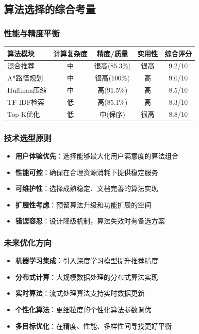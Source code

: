 \documentclass[12pt,a4paper]{article}
\begin{document}
\subsection{算法选择的综合考量}
\subsubsection{性能与精度平衡}
\begin{center}
\begin{tabular}{|l|c|c|c|c|}
\hline
\textbf{算法模块} & \textbf{计算复杂度} & \textbf{精度/质量} & \textbf{实用性} & \textbf{综合评分} \\
\hline
混合推荐 & 中 & 很高(85.3\%) & 很高 & 9.2/10 \\
A*路径规划 & 中 & 很高(100\%) & 高 & 9.0/10 \\
Huffman压缩 & 中 & 高(91.5\%) & 高 & 8.5/10 \\
TF-IDF检索 & 低 & 高(85.1\%) & 高 & 8.3/10 \\
Top-K优化 & 低 & 中(保序) & 很高 & 8.8/10 \\
\hline
\end{tabular}
\end{center}

\subsubsection{技术选型原则}
\begin{itemize}
    \item \textbf{用户体验优先}：选择能够最大化用户满意度的算法组合
    \item \textbf{性能可控}：确保在合理资源消耗下提供稳定服务
    \item \textbf{可维护性}：选择成熟稳定、文档完善的算法实现
    \item \textbf{扩展性考虑}：预留算法升级和功能扩展的空间
    \item \textbf{错误容忍}：设计降级机制，算法失效时有备选方案
\end{itemize}

\subsubsection{未来优化方向}
\begin{itemize}
    \item \textbf{机器学习集成}：引入深度学习模型提升推荐精度
    \item \textbf{分布式计算}：大规模数据处理的分布式算法实现
    \item \textbf{实时算法}：流式处理算法支持实时数据更新
    \item \textbf{个性化算法}：更细粒度的个性化算法参数调优
    \item \textbf{多目标优化}：在精度、性能、多样性间寻找更好平衡
\end{itemize}
\end{document}
